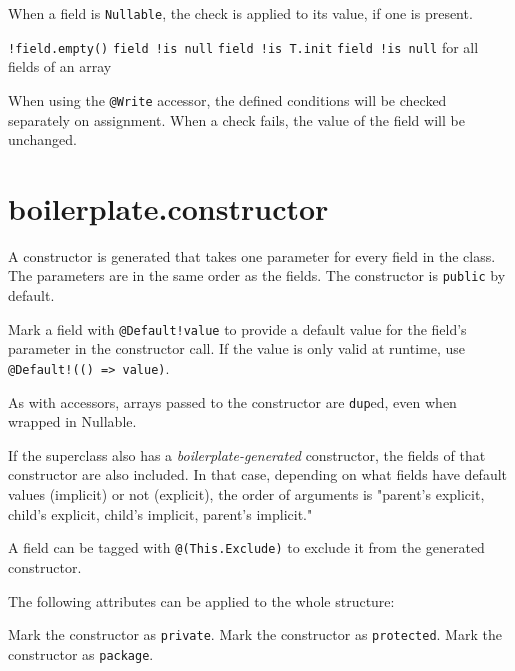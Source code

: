 When a field is \lstinline{Nullable}, the check is applied to its value, if one is present.

\begin{itemize}\raggedright
{} \lstinline{!field.empty()}
 \lstinline{field !is null}
 \lstinline{field !is T.init}
 \lstinline{field !is null} for all fields of an array
\end{itemize}

When using the \lstinline{@Write} accessor, the defined conditions will be checked separately on assignment.
When a check fails, the value of the field will be unchanged.

\vspace*{\fill}

\section*{boilerplate.constructor}
A constructor is generated that takes one parameter for every field in the class. The parameters are in the same order
as the fields. The constructor is \lstinline{public} by default.

Mark a field with \lstinline{@Default!value} to provide a default value
for the field's parameter in the constructor call. If the value is only valid at runtime, use
\lstinline{@Default!(() => value)}.

As with accessors, arrays passed to the constructor are \lstinline{dup}ed, even when wrapped in Nullable.

If the superclass also has a \emph{boilerplate-generated} constructor, the fields of that constructor are
also included. In that case, depending on what fields have default values (implicit) or not (explicit),
the order of arguments is "parent's explicit, child's explicit, child's implicit, parent's implicit."

A field can be tagged with \lstinline{@(This.Exclude)} to exclude it from the generated constructor.

The following attributes can be applied to the whole structure:
\begin{itemize}\raggedright
{} Mark the constructor as \lstinline{private}.
 Mark the constructor as \lstinline{protected}.
 Mark the constructor as \lstinline{package}.
\end{itemize}

\vspace*{\fill}
